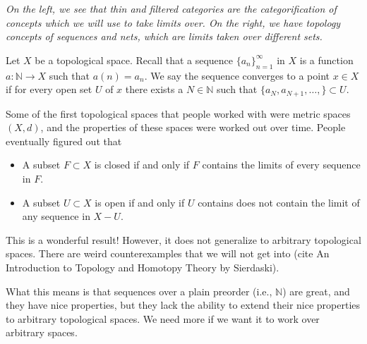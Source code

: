 \begin{center}

    \emph{On the left, we see that thin and filtered categories are the categorification of 
    concepts which we will use to take limits over. On the right, we have topology concepts 
    of sequences and nets, which are limits taken over different sets. }
\end{center}

Let $X$ be a topological space. Recall that a sequence $\{a_n\}_{n=1}^{\infty}$ in $X$ is a function 
$a: \mathbb{N}\to X$ such that $a(n) = a_n$. We say the sequence converges to a point 
$x \in X$ if for every open set $U$ of $x$ there exists a
$N \in \mathbb{N}$ such that $\{a_N, a_{N+1}, \dots, \} \subset U$. 

Some of the first topological spaces that people worked with were metric spaces $(X, d)$, 
and the properties of these spaces were worked out over time. People eventually figured out 
that 
\begin{itemize}
    \item A subset $F \subset X$ is closed if and only if $F$ contains 
    the limits of every sequence in $F$.
    \item A subset $U \subset X$ is open if and only if $U$ contains 
    does not contain the limit of any sequence in $X - U$. 
\end{itemize}
This is a wonderful result! However, it does not generalize to arbitrary topological 
spaces. There are weird counterexamples that we will not get into (cite An Introduction 
to Topology and Homotopy Theory by Sierdaski).

What this means is that sequences over a plain preorder (i.e., $\mathbb{N}$) are great, and they 
have nice 
properties, but they lack the ability to extend their nice properties to arbitrary 
topological spaces. We need more if we want it to work over arbitrary spaces. 

